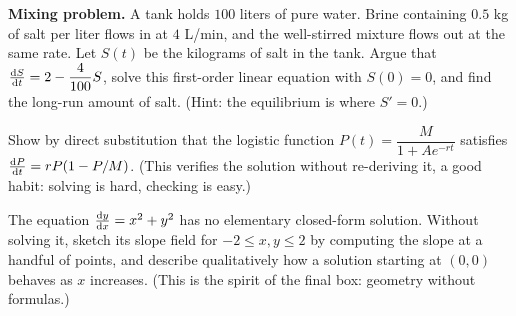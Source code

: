 \begin{exercise}
\textbf{Mixing problem.} A tank holds $100$ liters of pure water. Brine containing
$0.5$ kg of salt per liter flows in at $4$ L/min, and the well-stirred mixture
flows out at the same rate. Let $S(t)$ be the kilograms of salt in the tank. Argue
that $\frac{\mathrm{d} S}{\mathrm{d} t} = 2 - \dfrac{4}{100}S$, solve this first-order linear equation with
$S(0)=0$, and find the long-run amount of salt. (Hint: the equilibrium is where
$S'=0$.)
\end{exercise}

\begin{exercise}
Show by direct substitution that the logistic function
$P(t)=\dfrac{M}{1+Ae^{-rt}}$ satisfies $\frac{\mathrm{d} P}{\mathrm{d} t}=rP(1-P/M)$. (This verifies the
solution without re-deriving it, a good habit: solving is hard, checking is easy.)
\end{exercise}

\begin{exercise}
The equation $\frac{\mathrm{d} y}{\mathrm{d} x} = x^2 + y^2$ has no elementary closed-form solution. Without
solving it, sketch its slope field for $-2\le x,y\le 2$ by computing the slope at a
handful of points, and describe qualitatively how a solution starting at $(0,0)$
behaves as $x$ increases. (This is the spirit of the final box: geometry without
formulas.)
\end{exercise}
